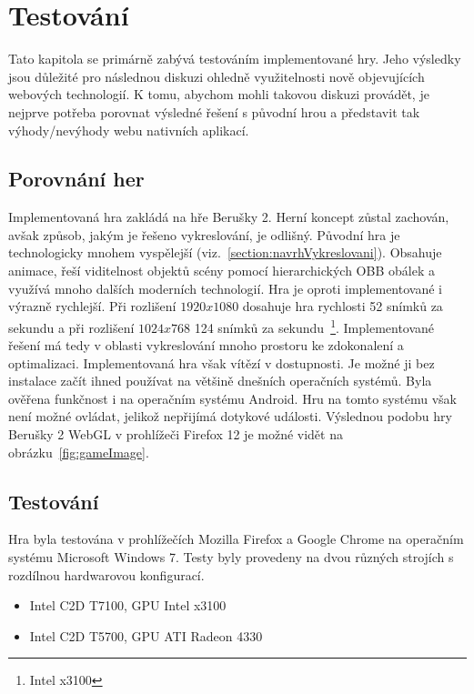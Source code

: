 \chapter{Testování}
\label{chap:testing}
Tato kapitola se primárně zabývá testováním implementované hry. Jeho výsledky jsou důležité pro následnou diskuzi ohledně využitelnosti nově objevujících webových technologií. K tomu, abychom mohli takovou diskuzi provádět, je nejprve potřeba porovnat výsledné řešení s původní hrou a představit tak výhody/nevýhody webu nativních aplikací.

\section*{Porovnání her}
Implementovaná hra zakládá na hře Berušky 2. Herní koncept zůstal zachován, avšak způsob, jakým je řešeno vykreslování, je odlišný. Původní hra je technologicky mnohem vyspělejší (viz.~\ref{section:navrhVykreslovani}). Obsahuje animace, řeší viditelnost objektů scény pomocí hierarchických OBB obálek a využívá mnoho dalších moderních technologií. Hra je oproti implementované i výrazně rychlejší. Při rozlišení $1920x1080$ dosahuje hra rychlosti 52 snímků za sekundu a při rozlišení $1024x768$ 124 snímků za sekundu~\footnote{Intel x3100}. Implementované řešení má tedy v oblasti vykreslování mnoho prostoru ke zdokonalení a optimalizaci. Implementovaná hra však vítězí v dostupnosti. Je možné ji bez instalace začít ihned používat na většině dnešních operačních systémů. Byla ověřena funkčnost i na operačním systému Android. Hru na tomto systému však není možné ovládat, jelikož nepřijímá dotykové události. Výslednou podobu hry Berušky 2 WebGL v prohlížeči Firefox 12 je možné vidět na obrázku~\ref{fig:gameImage}. 

\section*{Testování}
Hra byla testována v prohlížečích Mozilla Firefox a Google Chrome na operačním systému Microsoft Windows 7. Testy byly provedeny na dvou různých strojích s rozdílnou hardwarovou konfigurací.

\begin{itemize}
\item Intel C2D T7100, GPU Intel x3100
\item Intel C2D T5700, GPU ATI Radeon 4330
\end{itemize}

